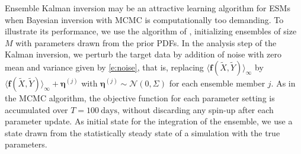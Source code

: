 \documentclass[draft]{agujournal}
\renewcommand{\vec}[1]{\boldsymbol{{#1}}}
\begin{document}
Ensemble Kalman inversion may be an attractive learning algorithm for ESMs when Bayesian inversion with MCMC is computationally too demanding. To illustrate its performance, we use the algorithm of \citet{Iglesias13a}, initializing ensembles of size $M$ with parameters drawn from the prior PDFs. In the analysis step of the Kalman inversion, we perturb the target data by addition of noise with zero mean and variance given by \eqref{e:noise}, that is, replacing $\langle \vec{f}(\tilde X, \tilde Y) \rangle_\infty$ by $\langle \vec{f}(\tilde X, \tilde Y) \rangle_\infty + \vec{\eta}^{(j)}$ with $\vec{\eta}^{(j)}\sim \mathcal N(0,\Sigma)$ for each ensemble member $j$. As in the MCMC algorithm, the objective function for each parameter setting is accumulated over $T=100~\mathrm{days}$, without discarding any spin-up after each parameter update. As initial state for the integration of the ensemble, we use a state drawn from the statistically steady state of a simulation with the true parameters.
\end{document}

